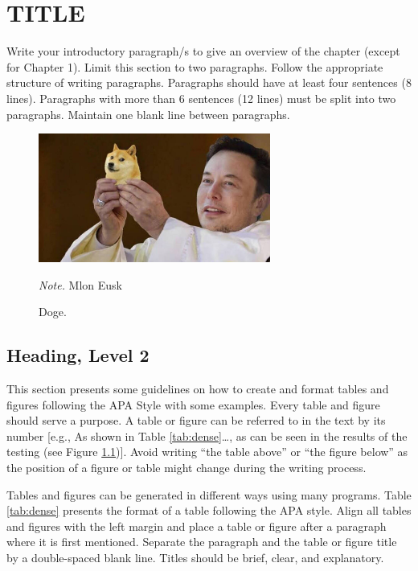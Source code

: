 \setlength{\footskip}{8mm}

\chapter{TITLE}

Write your introductory paragraph/s to give an overview of the chapter (except for Chapter 1). Limit this section to two paragraphs. Follow the appropriate structure of writing paragraphs. Paragraphs should have at least four sentences (8 lines). Paragraphs with more than 6 sentences (12 lines) must be split into two paragraphs.  Maintain one blank line between paragraphs.

\begin{figure}
\caption{Doge.}
\centerline{\includegraphics[width=3in]{figures/doge.jpeg}}
\label{fig:doge}
\textit{Note.} Mlon Eusk
\end{figure}

\section{Heading, Level 2}

This section presents some guidelines on how to create and format tables and figures following the APA Style with some examples. Every table and figure should serve a purpose. A table or figure can be referred to in the text by its number [e.g., As shown in Table \ref{tab:dense}…, as can be seen in the results of the testing (see Figure \ref{fig:doge})].  Avoid writing “the table above” or “the figure below” as the position of a figure or table might change during the writing process.

Tables and figures can be generated in different ways using many programs.  Table \ref{tab:dense} presents the format of a table following the APA style. Align all tables and figures with the left margin and place a table or figure after a paragraph where it is first mentioned. Separate the paragraph and the table or figure title by a double-spaced blank line. Titles should be brief, clear, and explanatory. 


